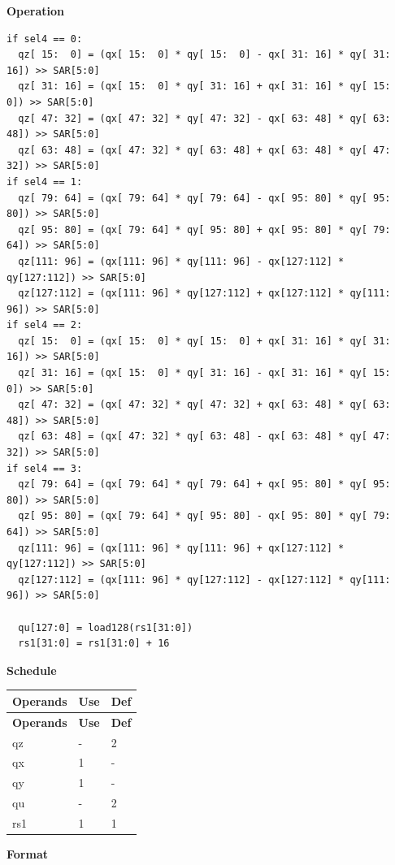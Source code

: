 \textbf{Operation}
\begin{lstlisting}
if sel4 == 0:
  qz[ 15:  0] = (qx[ 15:  0] * qy[ 15:  0] - qx[ 31: 16] * qy[ 31: 16]) >> SAR[5:0]
  qz[ 31: 16] = (qx[ 15:  0] * qy[ 31: 16] + qx[ 31: 16] * qy[ 15:  0]) >> SAR[5:0]
  qz[ 47: 32] = (qx[ 47: 32] * qy[ 47: 32] - qx[ 63: 48] * qy[ 63: 48]) >> SAR[5:0]
  qz[ 63: 48] = (qx[ 47: 32] * qy[ 63: 48] + qx[ 63: 48] * qy[ 47: 32]) >> SAR[5:0]
if sel4 == 1:
  qz[ 79: 64] = (qx[ 79: 64] * qy[ 79: 64] - qx[ 95: 80] * qy[ 95: 80]) >> SAR[5:0]
  qz[ 95: 80] = (qx[ 79: 64] * qy[ 95: 80] + qx[ 95: 80] * qy[ 79: 64]) >> SAR[5:0]
  qz[111: 96] = (qx[111: 96] * qy[111: 96] - qx[127:112] * qy[127:112]) >> SAR[5:0]
  qz[127:112] = (qx[111: 96] * qy[127:112] + qx[127:112] * qy[111: 96]) >> SAR[5:0]
if sel4 == 2:
  qz[ 15:  0] = (qx[ 15:  0] * qy[ 15:  0] + qx[ 31: 16] * qy[ 31: 16]) >> SAR[5:0]
  qz[ 31: 16] = (qx[ 15:  0] * qy[ 31: 16] - qx[ 31: 16] * qy[ 15:  0]) >> SAR[5:0]
  qz[ 47: 32] = (qx[ 47: 32] * qy[ 47: 32] + qx[ 63: 48] * qy[ 63: 48]) >> SAR[5:0]
  qz[ 63: 48] = (qx[ 47: 32] * qy[ 63: 48] - qx[ 63: 48] * qy[ 47: 32]) >> SAR[5:0]
if sel4 == 3:
  qz[ 79: 64] = (qx[ 79: 64] * qy[ 79: 64] + qx[ 95: 80] * qy[ 95: 80]) >> SAR[5:0]
  qz[ 95: 80] = (qx[ 79: 64] * qy[ 95: 80] - qx[ 95: 80] * qy[ 79: 64]) >> SAR[5:0]
  qz[111: 96] = (qx[111: 96] * qy[111: 96] + qx[127:112] * qy[127:112]) >> SAR[5:0]
  qz[127:112] = (qx[111: 96] * qy[127:112] - qx[127:112] * qy[111: 96]) >> SAR[5:0]

  qu[127:0] = load128(rs1[31:0])
  rs1[31:0] = rs1[31:0] + 16
\end{lstlisting}

\textbf{Schedule}\\
\begin{longtable}[c]{|l|l|l|}
    \hline
    \rowcolor{lightgray}
    \textbf{Operands} & \textbf{Use} & \textbf{Def} \\\hline
    \endfirsthead
    \hline
    \rowcolor{lightgray}
     \textbf{Operands} & \textbf{Use} & \textbf{Def} \\\hline
    \endhead
    \hline
    \endfoot


    qz & - & 2 \\\hline
     qx & 1 & - \\\hline
     qy & 1 & - \\\hline
     qu & - & 2 \\\hline
     rs1 & 1 & 1

\end{longtable}

\textbf{Format}\\

